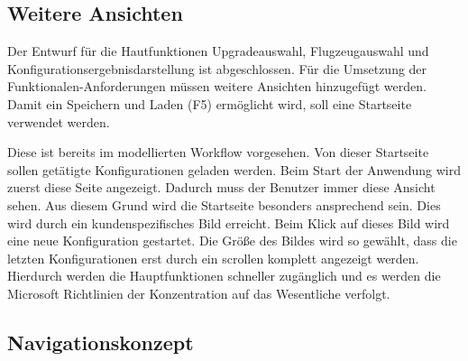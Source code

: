\subsection{Weitere Ansichten}
Der Entwurf für die Hautfunktionen Upgradeauswahl, Flugzeugauswahl und Konfigurationsergebnisdarstellung ist abgeschlossen. Für die Umsetzung der Funktionalen-Anforderungen müssen weitere Ansichten hinzugefügt werden. Damit ein Speichern und Laden (F5) ermöglicht wird, soll eine Startseite verwendet werden. \par 

Diese ist bereits im modellierten Workflow vorgesehen. Von dieser Startseite sollen getätigte Konfigurationen geladen werden. Beim Start der Anwendung wird zuerst diese Seite angezeigt. Dadurch muss der Benutzer immer diese Ansicht sehen. Aus diesem Grund wird die Startseite besonders ansprechend sein. Dies wird durch ein kundenspezifisches Bild erreicht. Beim Klick auf dieses Bild wird eine neue Konfiguration gestartet. Die Größe des Bildes wird so gewählt, dass die letzten Konfigurationen erst durch ein scrollen komplett angezeigt werden. Hierdurch werden die Hauptfunktionen schneller zugänglich und es werden die Microsoft Richtlinien der Konzentration auf das Wesentliche verfolgt. 

 

\subsection{Navigationskonzept}
